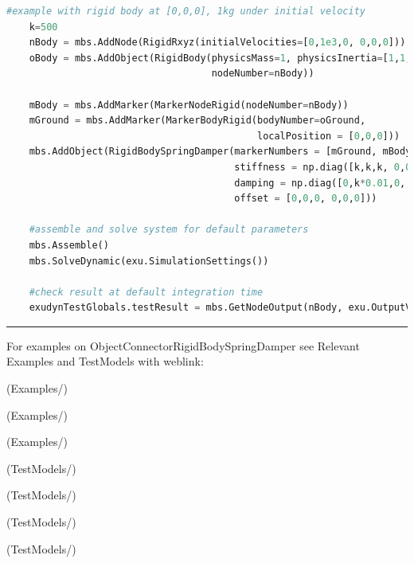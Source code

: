 \begin{lstlisting}[language=Python, firstnumber=1]
    #example with rigid body at [0,0,0], 1kg under initial velocity
    k=500
    nBody = mbs.AddNode(RigidRxyz(initialVelocities=[0,1e3,0, 0,0,0]))
    oBody = mbs.AddObject(RigidBody(physicsMass=1, physicsInertia=[1,1,1,0,0,0], 
                                    nodeNumber=nBody))
    
    mBody = mbs.AddMarker(MarkerNodeRigid(nodeNumber=nBody))
    mGround = mbs.AddMarker(MarkerBodyRigid(bodyNumber=oGround, 
                                            localPosition = [0,0,0]))
    mbs.AddObject(RigidBodySpringDamper(markerNumbers = [mGround, mBody], 
                                        stiffness = np.diag([k,k,k, 0,0,0]), 
                                        damping = np.diag([0,k*0.01,0, 0,0,0]), 
                                        offset = [0,0,0, 0,0,0]))
    
    #assemble and solve system for default parameters
    mbs.Assemble()
    mbs.SolveDynamic(exu.SimulationSettings())
    
    #check result at default integration time
    exudynTestGlobals.testResult = mbs.GetNodeOutput(nBody, exu.OutputVariableType.Displacement)[1] 
\end{lstlisting}

\vspace{6pt}\par\noindent\rule{\textwidth}{0.4pt}
%
\noindent For examples on ObjectConnectorRigidBodySpringDamper see Relevant Examples and TestModels with weblink:
\bi
\item {} (Examples/)
\item {} (Examples/)
\item {} (Examples/)
\item {} (TestModels/)
\item {} (TestModels/)
\item {} (TestModels/)
\item {} (TestModels/)

